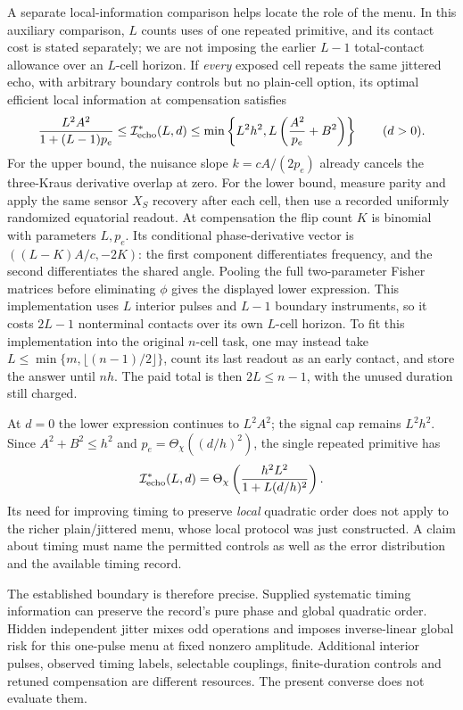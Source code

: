 \documentclass[11pt,a4paper]{article}
\numberwithin{equation}{section}
\theoremstyle{remark}
\begin{document}
A separate local-information comparison helps locate the role of the
menu. In this auxiliary comparison, $L$ counts uses of one repeated
primitive, and its contact cost is stated separately; we are not imposing
the earlier $L-1$ total-contact allowance over an $L$-cell horizon.
If \emph{every}
exposed cell repeats the same jittered echo, with arbitrary boundary
controls but no plain-cell option, its optimal efficient local information
at compensation satisfies
\begin{equation}
 \frac{L^2A^2}{1+(L-1)p_e}
 \le\mathcal I^*_{\rm echo}(L,d)
 \le\min\left\{L^2h^2,
 L\left(\frac{A^2}{p_e}+B^2\right)\right\}
 \qquad(d>0).
\end{equation}
For the upper bound, the nuisance slope $k=cA/(2p_e)$ already cancels the
three-Kraus derivative overlap at zero. For the lower bound, measure parity
and apply the same sensor $X_S$ recovery after each cell, then use a recorded
uniformly randomized equatorial readout. At compensation the flip count
$K$ is binomial with parameters $L,p_e$. Its conditional phase-derivative
vector is $((L-K)A/c,-2K)$: the first component differentiates frequency,
and the second differentiates the shared angle. Pooling the full two-parameter Fisher matrices
before eliminating $\phi$ gives the displayed lower expression.
This implementation uses $L$ interior pulses and $L-1$ boundary instruments,
so it costs $2L-1$ nonterminal contacts over its own $L$-cell horizon.
To fit this implementation into the original $n$-cell task, one may
instead take $L\le\min\{m,\lfloor(n-1)/2\rfloor\}$, count its last
readout as an early contact, and store the answer until $nh$.
The paid total is then $2L\le n-1$, with the unused duration still charged.

At $d=0$ the lower expression continues to $L^2A^2$; the signal cap remains
$L^2h^2$. Since $A^2+B^2\le h^2$ and
$p_e=\Theta_\chi((d/h)^2)$, the single repeated primitive has
\begin{equation}
 \mathcal I^*_{\rm echo}(L,d)
 =\Theta_\chi\left(\frac{h^2L^2}{1+L(d/h)^2}\right).
\end{equation}
Its need for improving timing to preserve \emph{local} quadratic order does
not apply to the richer plain/jittered menu, whose local protocol was just
constructed. A claim about timing must name the permitted controls as well
as the error distribution and the available timing record.

The established boundary is therefore precise. Supplied systematic timing
information can preserve the record's pure phase and global quadratic order.
Hidden independent jitter mixes odd operations and imposes inverse-linear
global risk for this one-pulse menu at fixed nonzero amplitude. Additional
interior pulses, observed timing labels, selectable couplings, finite-duration
controls and retuned compensation are different resources. The present
converse does not evaluate them.
\end{document}
